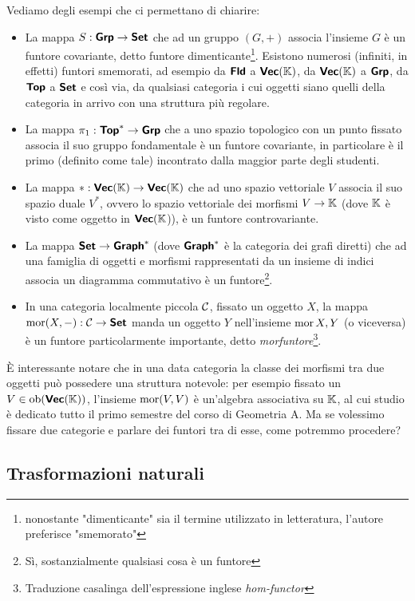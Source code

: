 \documentclass{article}
\begin{document}
Vediamo degli esempi che ci permettano di chiarire:\begin{itemize}
    \item La mappa $S:\text{\sffamily\textbf{Grp}} \to \text{\sffamily\textbf{Set}}$ che ad un gruppo $(G,+)$ associa l'insieme $G$ è un funtore covariante, detto funtore dimenticante\footnote{nonostante "dimenticante" sia il termine utilizzato in letteratura, l'autore preferisce "smemorato"}. Esistono numerosi (infiniti, in effetti) funtori smemorati, ad esempio da $\text{\sffamily\textbf{Fld}}$ a $\text{\sffamily\textbf{Vec}}(\mathbb{K})$, da $\text{\sffamily\textbf{Vec}}(\mathbb{K})$ a $\text{\sffamily\textbf{Grp}}$, da $\text{\sffamily\textbf{Top}}$ a $\text{\sffamily\textbf{Set}}$ e così via, da qualsiasi categoria i cui oggetti siano quelli della categoria in arrivo con una struttura più regolare.
    \item La mappa $\pi_1 : \text{\sffamily\textbf{Top}}^* \to \text{\sffamily\textbf{Grp}}$ che a uno spazio topologico con un punto fissato associa il suo gruppo fondamentale è un funtore covariante, in particolare è il primo (definito come tale) incontrato dalla maggior parte degli studenti.
    \item La mappa $*:\text{\sffamily\textbf{Vec}}(\mathbb{K}) \to \text{\sffamily\textbf{Vec}}(\mathbb{K}) $ che ad uno spazio vettoriale $V$ associa il suo spazio duale $V^*$, ovvero lo spazio vettoriale dei morfismi $V \to \mathbb{K}$ (dove $\mathbb{K}$ è visto come oggetto in $\text{\sffamily\textbf{Vec}}(\mathbb{K}$)), è un funtore controvariante.
    \item La mappa $\text{\sffamily\textbf{Set}} \to \text{\sffamily\textbf{Graph}}^*$ (dove $\text{\sffamily\textbf{Graph}}^*$ è la categoria dei grafi diretti) che ad una famiglia di oggetti e morfismi rappresentati da un insieme di indici associa un diagramma commutativo è un funtore\footnote{Sì, sostanzialmente qualsiasi cosa è un funtore}.
    \item In una categoria localmente piccola $\mathcal{C}$, fissato un oggetto $X$, la mappa $\operatorname{mor}(X,-):\mathcal{C}\to\text{\sffamily\textbf{Set}}$ manda un oggetto $Y$ nell'insieme $\operatorname{mor}{X,Y}$ (o viceversa) è un funtore particolarmente importante, detto \textit{morfuntore}\footnote{Traduzione casalinga dell'espressione inglese \textit{hom-functor}}.
\end{itemize}

È interessante notare che in una data categoria la classe dei morfismi tra due oggetti può possedere una struttura notevole: per esempio fissato un $V \in \operatorname{ob}(\text{\sffamily\textbf{Vec}}(\mathbb{K}))$, l'insieme $\operatorname{mor}(V,V)$ è un'algebra associativa su $\mathbb{K}$, al cui studio è dedicato tutto il primo semestre del corso di Geometria A. Ma se volessimo fissare due categorie e parlare dei funtori tra di esse, come potremmo procedere?

\subsection{Trasformazioni naturali}
\end{document}
